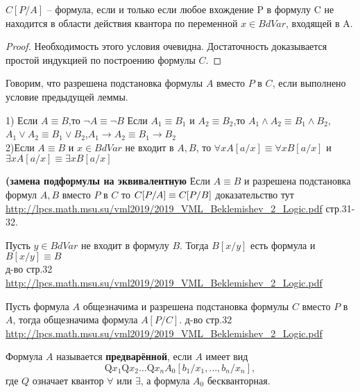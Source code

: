 \begin{lemma}
	$C[P/A]$ -- формула, если и только если любое вхождение P в формулу C не находится в области действия квантора
	по переменной $x\in BdVar$, входящей в A.
\end{lemma}
\begin{proof}
     Необходимость этого условия очевидна. Достаточность доказывается простой индукцией по построению формулы $C$.
\end{proof}
\begin{definition}
    Говорим, что разрешена подстановка формулы $A$ вместо $P$ в $C$, если выполнено условие предыдущей леммы.
\end{definition}
\begin{lemma}
	1) Если $A\equiv B$,то $\neg A \equiv \neg B$ Если $A_1\equiv B_1$ и $A_2\equiv B_2$,то $A_1\wedge A_2\equiv
	B_1 \wedge B_2$,$A_1\lor A_2\equiv B_1 \lor B_2$,$A_1\rightarrow A_2\equiv B_1 \rightarrow B_2$\\
	2)Если $A\equiv B$ и $x \in BdVar$ не входит в $A,B$, то $\forall x A[a / x] \equiv \forall x B[a / x]$ и
	$\exists x A[a / x] \equiv \exists x B[a / x]$
\end{lemma}
\begin{theorem}
	\textbf{(замена подформулы на эквивалентную} Если $A \equiv B$ и разрешена подстановка формул $A,B$ вместо $P$
	в $C$ то $C[P/A]\equiv C[P/B]\\$
    доказательство тут \url{http://lpcs.math.msu.su/vml2019/2019_VML_Beklemishev_2_Logic.pdf} стр.31-32.
\end{theorem}
\begin{lemma}
    Пусть $y\in BdVar$ не входит в формулу $B$. Тогда $B[x/y]$ есть формула и $B[x/y] \equiv B$ \\
    д-во стр.32 \url{http://lpcs.math.msu.su/vml2019/2019_VML_Beklemishev_2_Logic.pdf} 
\end{lemma}
\begin{theorem}
	Пусть формула $A$ общезначима и разрешена подстановка формулы $C$ вместо $P$ в $A$, тогда общезначима формула
	$A[P/C]$.
     д-во стр.32 \url{http://lpcs.math.msu.su/vml2019/2019_VML_Beklemishev_2_Logic.pdf} 
\end{theorem}
\begin{definition}
	Формула $A$ называется \textbf{предварённой}, если $A$ имеет вид $$\mathrm{Q} x_{1} \mathrm{Q} x_{2} \ldots
	\mathrm{Q} x_{n} A_{0}\left[b_{1} / x_{1}, \ldots, b_{n} / x_{n}\right],$$где $Q$ означает квантор $\forall$ или
	$\exists$, а формула $A_0$ бескванторная.
\end{definition}
